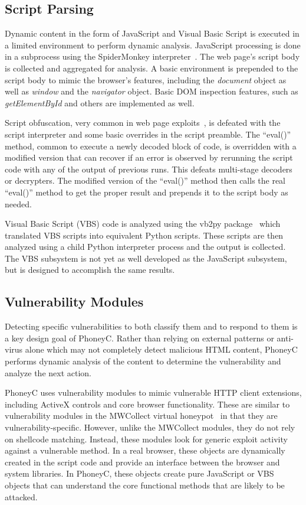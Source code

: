 \documentclass[10pt,twocolumn]{article}
\begin{document}
\subsection{Script Parsing}
\label{script-parsing}

Dynamic content in the form of JavaScript and Visual Basic Script is executed in a limited environment to perform dynamic analysis. JavaScript processing is done in a subprocess using the SpiderMonkey interpreter~\cite{foundation:sjc}. The web page's script body is collected and aggregated for analysis. A basic environment is prepended to the script body to mimic the browser's features, including the {\em document} object as well as {\em window} and the {\em navigator} object. Basic DOM inspection features, such as {\em getElementById} and others are implemented as well. 

Script obfuscation, very common in web page exploits~\cite{provos:ayi}, is defeated with the script interpreter and some basic overrides in the script preamble. The ``eval()'' method, common to execute a newly decoded block of code, is overridden with a modified version that can recover if an error is observed by rerunning the script code with any of the output of previous runs. This defeats multi-stage decoders or decrypters. The modified version of  the ``eval()'' method then calls the real ``eval()'' method to get the proper result and prepends it to the script body as needed.

Visual Basic Script (VBS) code is analyzed using the vb2py package~\cite{vb2py} which translated VBS scripts into equivalent Python scripts. These scripts are then analyzed using a child Python interpreter process and the output is collected. The VBS subsystem is not yet as well developed as the JavaScript subsystem, but is designed to accomplish the same results.

\subsection{Vulnerability Modules}
\label{vuln-modules}

Detecting specific vulnerabilities to both classify them and to respond to them is a key design goal of PhoneyC. Rather than relying on external patterns or anti-virus alone which may not completely detect malicious HTML content, PhoneyC performs dynamic analysis of the content to determine the vulnerability and analyze the next action.

PhoneyC uses vulnerability modules to mimic vulnerable HTTP client extensions, including ActiveX controls and core browser functionality. These are similar to vulnerability modules in the MWCollect virtual honeypot~\cite{freiling2005bte} in that they are vulnerability-specific. However, unlike the MWCollect modules, they do not rely on shellcode matching. Instead, these modules look for generic exploit activity against a vulnerable method. In a real browser, these objects are dynamically created in the script code and provide an interface between the browser and system libraries. In PhoneyC, these objects create pure JavaScript or VBS objects that can understand the core functional methods that are likely to be attacked. 
\end{document}
